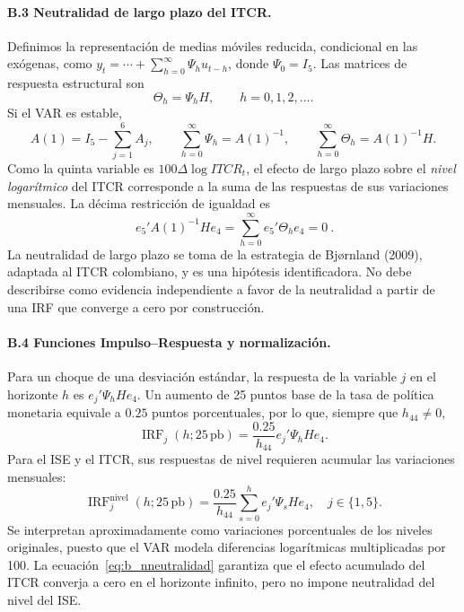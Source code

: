 \documentclass[12pt,letterpaper]{article}
\begin{document}
\paragraph{B.3 Neutralidad de largo plazo del ITCR.}
Definimos la representación de medias móviles reducida, condicional en las exógenas, como $y_t=\cdots+\sum_{h=0}^{\infty}\Psi_hu_{t-h}$, donde $\Psi_0=I_5$. Las matrices de respuesta estructural son
\begin{equation}
\Theta_h=\Psi_hH,\qquad h=0,1,2,\ldots.
\label{eq:b_irf}
\end{equation}
Si el VAR es estable,
\begin{equation}
A(1)=I_5-\sum_{j=1}^{6}A_j,
\qquad \sum_{h=0}^{\infty}\Psi_h=A(1)^{-1},
\qquad \sum_{h=0}^{\infty}\Theta_h=A(1)^{-1}H.
\label{eq:b_longrun}
\end{equation}
Como la quinta variable es $100\Delta\log ITCR_t$, el efecto de largo plazo sobre el \emph{nivel logarítmico} del ITCR corresponde a la suma de las respuestas de sus variaciones mensuales. La décima restricción de igualdad es
\begin{equation}
\boxed{\ e_5'A(1)^{-1}He_4=\sum_{h=0}^{\infty}e_5'\Theta_he_4=0\ }.
\label{eq:b_nneutralidad}
\end{equation}
La neutralidad de largo plazo se toma de la estrategia de Bj{\o}rnland (2009), adaptada al ITCR colombiano, y es una hipótesis identificadora. No debe describirse como evidencia independiente a favor de la neutralidad a partir de una IRF que converge a cero por construcción.

\paragraph{B.4 Funciones Impulso--Respuesta y normalización.}
Para un choque de una desviación estándar, la respuesta de la variable $j$ en el horizonte $h$ es $e_j'\Psi_hHe_4$. Un aumento de 25 puntos base de la tasa de política monetaria equivale a $0.25$ puntos porcentuales, por lo que, siempre que $h_{44}\ne0$,
\begin{equation}
\operatorname{IRF}_{j}(h;25\,\mathrm{pb})=
\frac{0.25}{h_{44}}e_j'\Psi_hHe_4.
\label{eq:b_norm}
\end{equation}
Para el ISE y el ITCR, sus respuestas de nivel requieren acumular las variaciones mensuales:
\begin{equation}
\operatorname{IRF}^{\mathrm{nivel}}_{j}(h;25\,\mathrm{pb})=
\frac{0.25}{h_{44}}\sum_{s=0}^{h}e_j'\Psi_sHe_4,
\quad j\in\{1,5\}.
\label{eq:b_acum}
\end{equation}
Se interpretan aproximadamente como variaciones porcentuales de los niveles originales, puesto que el VAR modela diferencias logarítmicas multiplicadas por 100. La ecuación~\eqref{eq:b_nneutralidad} garantiza que el efecto acumulado del ITCR converja a cero en el horizonte infinito, pero no impone neutralidad del nivel del ISE.
\end{document}
